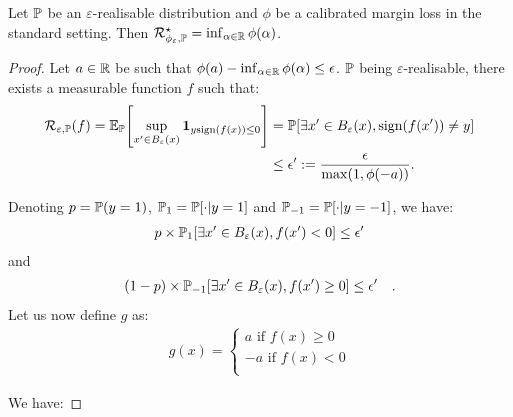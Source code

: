 \begin{lemma}
    \label{lemma:realisable}
    Let $\mathbb{P}$ be an $\varepsilon$-realisable distribution and $\phi$ be a calibrated margin loss in the standard setting. Then $\mathcal{R}^\star_{\phi_\varepsilon,\mathbb{P}}=\inf_{\alpha\in\mathbb{R}}\phi(\alpha)$.
    \end{lemma}
\begin{proof}
Let $a\in\mathbb{R}$ be such that $\phi(a)-\inf_{\alpha\in\mathbb{R}} \phi(\alpha) \leq \epsilon$. $\mathbb{P}$ being $\varepsilon$-realisable, there exists a measurable function $f$ such that:
\begin{align*}
    \risk_{\varepsilon,\PP}(f) = \mathbb{E}_\PP\left[\sup_{x'\in B_\varepsilon(x)} \mathbf{1}_{y\text{sign}(f(x))\leq 0}\right] &=  \PP\left[\exists x'\in B_\varepsilon(x), \text{sign}(f(x'))\neq y\right]\\
    &\leq \epsilon':= \frac{\epsilon}{\max(1,\phi(-a))}.\\
\end{align*}

Denoting $p =\mathbb{P}(y=1)$, $\mathbb{P}_1 = \mathbb{P}[\cdot|y=1]$ and $\mathbb{P}_{-1} = \mathbb{P}[\cdot|y=-1]$, we have:
\begin{align*}
        p\times\PP_1\left[\exists x'\in B_\varepsilon(x), f(x')<0\right]\leq \epsilon'
\end{align*}
and
\begin{align*}
    (1-p)\times\PP_{-1}\left[\exists x'\in B_\varepsilon(x), f(x')\geq0\right]\leq \epsilon'\quad.
\end{align*}
Let us now define $g$ as:
\begin{align*}
        g(x)= \left\{
    \begin{array}{ll}
    a\text{ if } f(x)\geq 0\\
    -a\text{ if } f(x)< 0\\
    \end{array}
    \right.
\end{align*}

We have:


\end{proof}
